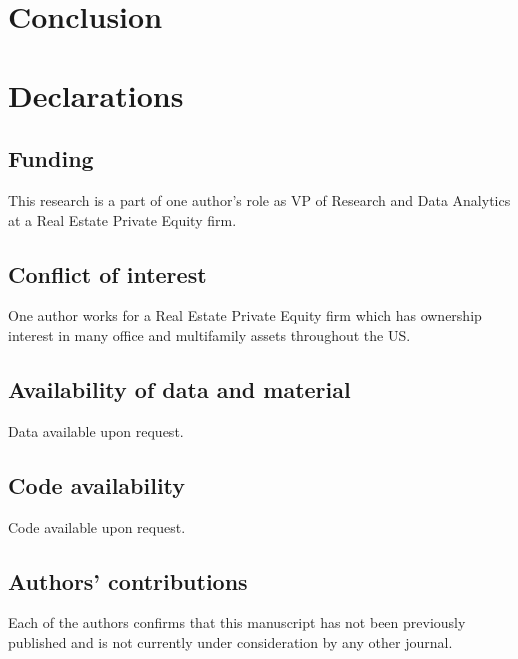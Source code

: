 \section{Conclusion}

\pagebreak


%
\section*{Declarations}
\subsection{Funding}
This research is a part of one author's role as VP of Research and Data Analytics at a Real Estate Private Equity firm. 

\subsection{Conflict of interest}
One author works for a Real Estate Private Equity firm which has ownership interest in many office and multifamily assets throughout the US. 

\subsection{Availability of data and material}
Data available upon request.

\subsection{Code availability}
Code available upon request.

\subsection{Authors' contributions}
Each of the authors confirms that this manuscript has not been previously published and is not currently under consideration by any other journal.




%
%
 



